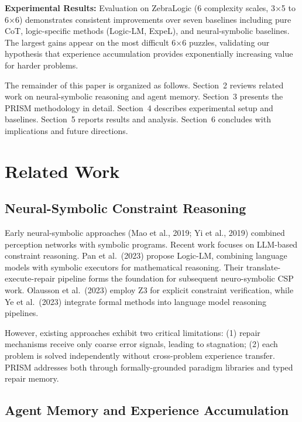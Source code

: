 \documentclass[letterpaper]{article}
\begin{document}
\textbf{Experimental Results:} Evaluation on ZebraLogic (6 complexity scales, 3×5 to 6×6) demonstrates consistent improvements over seven baselines including pure CoT, logic-specific methods (Logic-LM, ExpeL), and neural-symbolic baselines. The largest gains appear on the most difficult 6×6 puzzles, validating our hypothesis that experience accumulation provides exponentially increasing value for harder problems.

The remainder of this paper is organized as follows. Section~2 reviews related work on neural-symbolic reasoning and agent memory. Section~3 presents the PRISM methodology in detail. Section~4 describes experimental setup and baselines. Section~5 reports results and analysis. Section~6 concludes with implications and future directions.


\section{Related Work}

\subsection{Neural-Symbolic Constraint Reasoning}

Early neural-symbolic approaches (Mao et al., 2019; Yi et al., 2019) combined perception networks with symbolic programs. Recent work focuses on LLM-based constraint reasoning. Pan et al.~(2023) propose Logic-LM, combining language models with symbolic executors for mathematical reasoning. Their translate-execute-repair pipeline forms the foundation for subsequent neuro-symbolic CSP work. Olausson et al.~(2023) employ Z3 for explicit constraint verification, while Ye et al.~(2023) integrate formal methods into language model reasoning pipelines.

However, existing approaches exhibit two critical limitations: (1) repair mechanisms receive only coarse error signals, leading to stagnation; (2) each problem is solved independently without cross-problem experience transfer. PRISM addresses both through formally-grounded paradigm libraries and typed repair memory.

\subsection{Agent Memory and Experience Accumulation}
\end{document}
